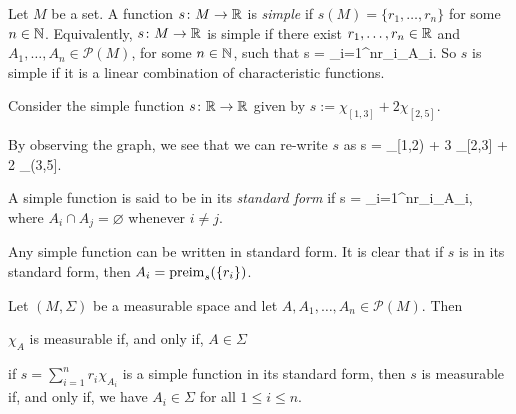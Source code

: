 \bd
Let $M$ be a set. A function $s\colon M \to \mathbb{R}$ is \emph{simple} if $s(M) = \{r_1,\ldots,r_n\}$ for some $n\in \mathbb{N}$. 
\ed
Equivalently, $s\colon M \to \mathbb{R}$ is simple if there exist $r_1,\ldots,r_n\in\mathbb{R}$ and $A_1,\ldots,A_n\in\mathscr{P}(M)$, for some $n\in \mathbb{N}$, such that
\bse
s = \sum_{i=1}^nr_i\chi_{A_i}.
\ese
So $s$ is simple if it is a linear combination of characteristic functions.

\be
Consider the simple function $s\colon \mathbb{R} \to \mathbb{R}$ given by $s:=\chi_{[1,3]}+2\chi_{[2,5]}$.
\begin{center}
\end{center}
By observing the graph, we see that we can re-write $s$ as
\bse
s = \chi_{[1,2)} + 3 \chi_{[2,3]} + 2 \chi_{(3,5]}.
\ese
\ee

\bd
A simple function is said to be in its \emph{standard form} if
\bse
s = \sum_{i=1}^nr_i\chi_{A_i},
\ese
where $A_i \cap A_j = \varnothing$ whenever $i\neq j$.
\ed

Any simple function can be written in standard form. It is clear that if $s$ is in its standard form, then $A_i = \operatorname{preim}_s(\{r_i\})$. 

\bp
Let $(M,\Sigma)$ be a measurable space and let $A,A_1,\ldots,A_n\in\mathscr{P}(M)$. Then
\ben[label=(\roman*)]
\item $\chi_A$ is measurable if, and only if, $A\in\Sigma$
\item if $s=\sum_{i=1}^n r_i \chi_{A_i}$ is a simple function in its standard form, then $s$ is measurable if, and only if, we have $A_i\in \Sigma$ for all $1\leq i\leq n$.
\een
\ep
